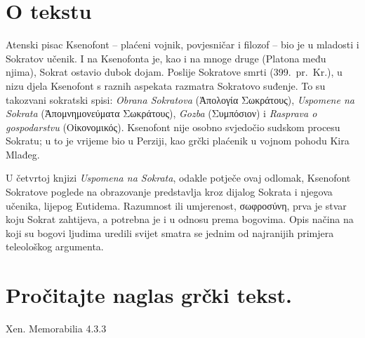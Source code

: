 


\section*{O tekstu}

Atenski pisac Ksenofont – plaćeni vojnik, povjesničar i filozof – bio je u mladosti i Sokratov učenik. I na Ksenofonta je, kao i na mnoge druge (Platona među njima), Sokrat ostavio dubok dojam. Poslije Sokratove smrti (399.\ pr.~Kr.), u nizu djela Ksenofont s raznih aspekata razmatra Sokratovo suđenje. To su takozvani sokratski spisi: \textit{Obrana Sokratova} \textgreek[variant=ancient]{(Ἀπολογία Σωκράτους)}, \textit{Uspomene na Sokrata} \textgreek[variant=ancient]{(Ἀπομνημονεύματα Σωκράτους)}, \textit{Gozba} \textgreek[variant=ancient]{(Συμπόσιον)} i \textit{Rasprava o gospodarstvu} \textgreek[variant=ancient]{(Οἰκονομικός)}. Ksenofont nije osobno svjedočio sudskom procesu Sokratu; u to je vrijeme bio u Perziji, kao grčki plaćenik u vojnom pohodu Kira Mlađeg.

U četvrtoj knjizi \textit{Uspomena na Sokrata}, odakle potječe ovaj odlomak, Ksenofont Sokratove poglede na obrazovanje predstavlja kroz dijalog Sokrata i njegova učenika, lijepog Eutidema. Razumnost ili umjerenost, \textgreek[variant=ancient]{σωφροσύνη,} prva je stvar koju Sokrat zahtijeva, a potrebna je i u odnosu prema bogovima. Opis načina na koji su bogovi ljudima uredili svijet smatra se jednim od najranijih primjera teleološkog argumenta.

\newpage

\section*{Pročitajte naglas grčki tekst.}

Xen. Memorabilia 4.3.3


\medskip


